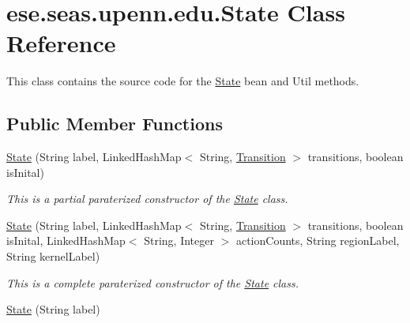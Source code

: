 \hypertarget{classese_1_1seas_1_1upenn_1_1edu_1_1_state}{}\section{ese.\+seas.\+upenn.\+edu.\+State Class Reference}
\label{classese_1_1seas_1_1upenn_1_1edu_1_1_state}


This class contains the source code for the \hyperlink{classese_1_1seas_1_1upenn_1_1edu_1_1_state}{State} bean and Util methods.  


\subsection*{Public Member Functions}
\begin{DoxyCompactItemize}
\item 
\hypertarget{classese_1_1seas_1_1upenn_1_1edu_1_1_state_a46c6ce319257a9522f8427cc51b4beca}{}\hyperlink{classese_1_1seas_1_1upenn_1_1edu_1_1_state_a46c6ce319257a9522f8427cc51b4beca}{State} (String label, Linked\+Hash\+Map$<$ String, \hyperlink{classese_1_1seas_1_1upenn_1_1edu_1_1_transition}{Transition} $>$ transitions, boolean is\+Inital)\label{classese_1_1seas_1_1upenn_1_1edu_1_1_state_a46c6ce319257a9522f8427cc51b4beca}

\begin{DoxyCompactList}\small\item\em This is a partial paraterized constructor of the \hyperlink{classese_1_1seas_1_1upenn_1_1edu_1_1_state}{State} class. \end{DoxyCompactList}\item 
\hypertarget{classese_1_1seas_1_1upenn_1_1edu_1_1_state_a565b9e44a4d812b767834b423064e942}{}\hyperlink{classese_1_1seas_1_1upenn_1_1edu_1_1_state_a565b9e44a4d812b767834b423064e942}{State} (String label, Linked\+Hash\+Map$<$ String, \hyperlink{classese_1_1seas_1_1upenn_1_1edu_1_1_transition}{Transition} $>$ transitions, boolean is\+Inital, Linked\+Hash\+Map$<$ String, Integer $>$ action\+Counts, String region\+Label, String kernel\+Label)\label{classese_1_1seas_1_1upenn_1_1edu_1_1_state_a565b9e44a4d812b767834b423064e942}

\begin{DoxyCompactList}\small\item\em This is a complete paraterized constructor of the \hyperlink{classese_1_1seas_1_1upenn_1_1edu_1_1_state}{State} class. \end{DoxyCompactList}\item 
\hypertarget{classese_1_1seas_1_1upenn_1_1edu_1_1_state_ac55ed67de827404560d5150c18c22bef}{}\hyperlink{classese_1_1seas_1_1upenn_1_1edu_1_1_state_ac55ed67de827404560d5150c18c22bef}{State} (String label)\label{classese_1_1seas_1_1upenn_1_1edu_1_1_state_ac55ed67de827404560d5150c18c22bef}


\end{DoxyCompactItemize}
